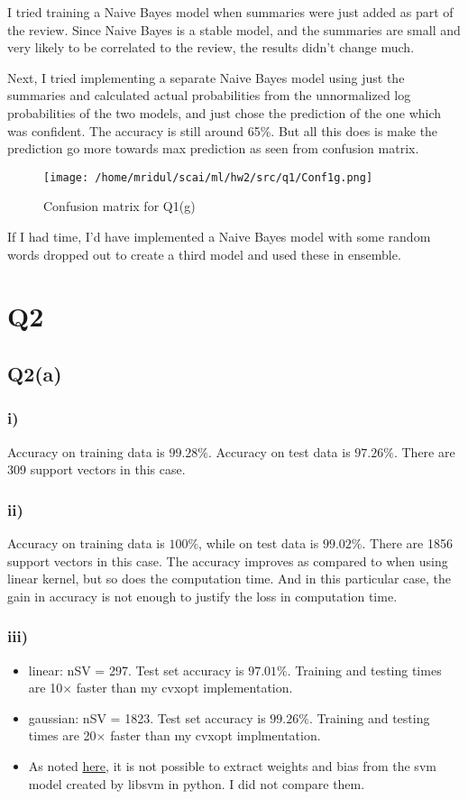 \documentclass[11pt]{article}
\begin{document}
I tried training a Naive Bayes model when summaries were just added as part of
the review. Since Naive Bayes is a stable model, and the summaries are small and
very likely to be correlated to the review, the results didn't change much.\par
Next, I tried implementing a separate Naive Bayes model using just the summaries
and calculated actual probabilities from the unnormalized log probabilities of
the two models, and just chose the prediction of the one which was confident.
The accuracy is still around 65\%. But all this does is make the prediction go
more towards max prediction as seen from confusion matrix.
\begin{figure}
	\texttt{[image: /home/mridul/scai/ml/hw2/src/q1/Conf1g.png]}
	\caption{Confusion matrix for Q1(g)}
\end{figure}
If I had time, I'd have implemented a Naive
Bayes model with some random words dropped out to create a third model and used
these in ensemble.
\section{Q2}
\label{sec:orgfc0fbfa}

\subsection{Q2(a)}
\label{sec:org1b1d25b}
\subsubsection{i)}
\label{sec:orgb1d3619}
Accuracy on training data is \(99.28\%\). Accuracy on test data is
\(97.26\%\). There are 309 support vectors in this case.

\subsubsection{ii)}
\label{sec:org1f15d28}
Accuracy on training data is \(100\%\), while on test data is
\(99.02\%\). There are 1856 support vectors in this case. The accuracy
improves as compared to when using linear kernel, but so does the
computation time. And in this particular case, the gain in accuracy is
not enough to justify the loss in computation time.

\subsubsection{iii)}
\label{sec:orgeed620b}
\begin{itemize}
\item linear: nSV = 297. Test set accuracy is \(97.01\%\). Training and
testing times are 10\(\times\) faster than my cvxopt implementation.
\item gaussian: nSV = 1823. Test set accuracy is \(99.26\%\). Training and
testing times are 20\(\times\) faster than my cvxopt implmentation.
\item As noted \href{https://stackoverflow.com/a/5333279}{here}, it is not possible to extract weights and bias from
the svm model created by libsvm in python. I did not compare them.
\end{itemize}
\end{document}
